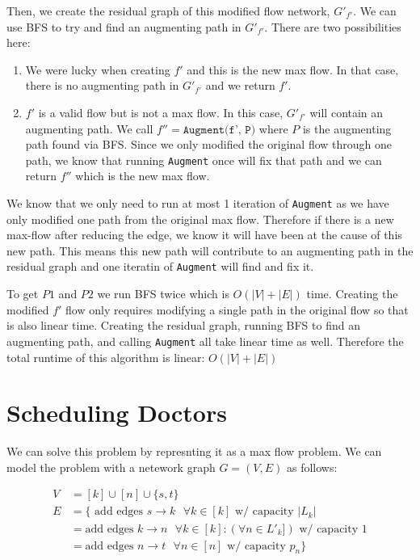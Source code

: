 \documentclass{article}
\begin{document}
Then, we create the residual graph of this modified flow network, $G'_{f'}$. We can use BFS to try and find an augmenting path in $G'_{f'}$. There are two possibilities here:


\begin{enumerate}
    \item We were lucky when creating $f'$ and this is the new max flow.
    In that case, there is no augmenting path in $G'_{f'}$ and we return $f'$.
    
    \item $f'$ is a valid flow but is not a max flow. In this case, $G'_{f'}$ will contain an augmenting path.
            We call $f'' = \texttt{Augment(f', P)}$ where $P$ is the augmenting path found via BFS.
            Since we only modified the original flow through one path, we know that running \texttt{Augment} once will fix that path and we can return $f''$ which is the new max flow.
\end{enumerate}

We know that we only need to run at most 1 iteration of \texttt{Augment} as we have only modified one path from the original max flow.
Therefore if there is a new max-flow after reducing the edge, we know it will have been at the cause of this new path. This means this new path will contribute to an augmenting path in the residual graph and one iteratin of \texttt{Augment} will find and fix it.  

To get $P1$ and $P2$ we run BFS twice which is $O(|V| + |E|)$ time. Creating the modified $f'$ flow only requires modifying a single path in the original flow so that is also linear time.
Creating the residual graph, running BFS to find an augmenting path, and calling \texttt{Augment} all take linear time as well. Therefore the total runtime of this algorithm is linear: $O(|V| + |E|)$

\newpage
\section{Scheduling Doctors}

We can solve this problem by represnting it as a max flow problem. We can model the problem with a netework graph $G = (V, E)$ as follows:

\begin{align*}
    V &= [k] \cup [n] \cup \{s, t\} \\
    E &= \{\text{ 
        add edges $s \longrightarrow k$  $\forall k\in [k]$ w/ capacity $|L_k|$} \\
      &=  \text{add edges $k \longrightarrow n$  $\forall k\in [k]: (\forall n\in L'_k])$ w/ capacity 1} \\
      &=  \text{add edges $n \longrightarrow t$ $\forall n\in [n]$ w/ capacity $p_n$}\}
\end{align*}
\end{document}
